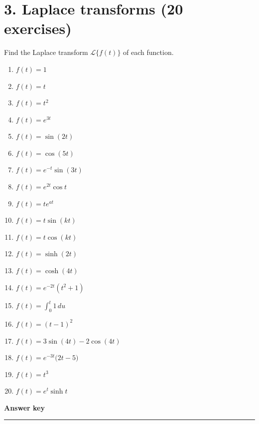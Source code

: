 \documentclass[11pt,a4paper]{article}
\begin{document}
\section*{3. Laplace transforms (20 exercises)}
Find the Laplace transform $\mathcal{L}\{f(t)\}$ of each function.

\begin{enumerate}
    \item $f(t)=1$
    \item $f(t)=t$
    \item $f(t)=t^2$
    \item $f(t)=e^{3t}$
    \item $f(t)=\sin(2t)$
    \item $f(t)=\cos(5t)$
    \item $f(t)=e^{-t}\sin(3t)$
    \item $f(t)=e^{2t}\cos t$
    \item $f(t)=t e^{at}$
    \item $f(t)=t\sin(kt)$
    \item $f(t)=t\cos(kt)$
    \item $f(t)=\sinh(2t)$
    \item $f(t)=\cosh(4t)$
    \item $f(t)=e^{-2t}(t^2+1)$
    \item $f(t)=\displaystyle \int_0^t 1\,du$
    \item $f(t)=(t-1)^2$
    \item $f(t)=3\sin(4t)-2\cos(4t)$
    \item $f(t)=e^{-3t}\bigl(2t-5\bigr)$
    \item $f(t)=t^3$
    \item $f(t)=e^t\sinh t$
\end{enumerate}

\newpage
\begin{center}
    {\Large \textbf{Answer key}}\\[0.3em]
    \rule{0.7\textwidth}{0.6pt}
\end{center}
\end{document}
